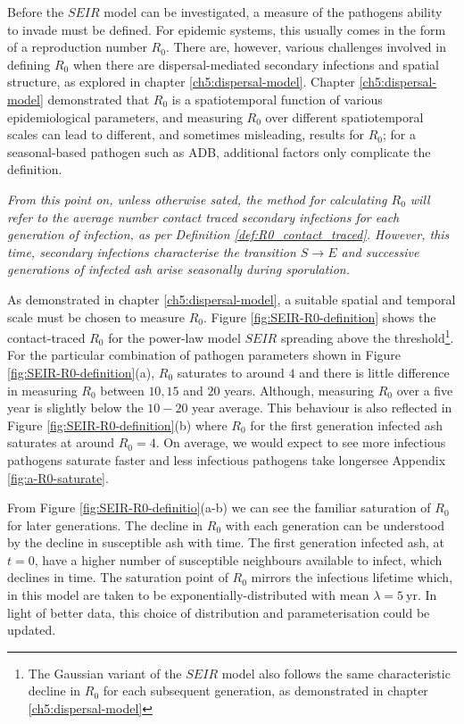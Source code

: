 Before the $SEIR$ model can be investigated, a measure of the pathogens ability to invade must be defined. For epidemic systems, this usually comes in the form of a reproduction number $R_0$. There are, however, various challenges involved in defining $R_0$ when there are dispersal-mediated secondary infections and spatial structure, as explored in chapter \ref{ch5:dispersal-model}. Chapter \ref{ch5:dispersal-model} demonstrated that $R_0$ is a spatiotemporal function of various epidemiological parameters, and measuring $R_0$ over different spatiotemporal scales can lead to different, and sometimes misleading, results for $R_0$; for a seasonal-based pathogen such as ADB, additional factors only complicate the definition. 

\textit{From this point on, unless otherwise sated, the method for calculating $R_0$ will refer to the average number contact traced secondary infections for each generation of infection, as per Definition \ref{def:R0_contact_traced}. However, this time, secondary infections characterise the transition $S\rightarrow E$ and successive generations of infected ash arise seasonally during sporulation.}

As demonstrated in chapter \ref{ch5:dispersal-model}, a suitable spatial and temporal scale must be chosen to measure $R_0$. Figure \ref{fig:SEIR-R0-definition} shows the contact-traced $R_0$ for the power-law model $SEIR$ spreading above the threshold\footnote{The Gaussian variant of the $SEIR$ model also follows the same characteristic decline in $R_0$ for each subsequent generation, as demonstrated in chapter \ref{ch5:dispersal-model}}. For the particular combination of pathogen parameters shown in Figure \ref{fig:SEIR-R0-definition}(a), $R_0$ saturates to around $4$ and there is little difference in measuring $R_0$ between $10, 15$ and $20$ years. Although, measuring $R_0$ over a five year is slightly below the $10-20$ year average. This behaviour is also reflected in Figure \ref{fig:SEIR-R0-definition}(b) where $R_0$ for the first generation infected ash saturates at around $R_0 = 4$. On average, we would expect to see more infectious pathogens saturate faster and less infectious pathogens take longer\textemdash see Appendix \ref{fig:a-R0-saturate}.

From Figure \ref{fig:SEIR-R0-definitio}(a-b) we can see the familiar saturation of $R_0$ for later generations. The decline in $R_0$ with each generation can be understood by the decline in susceptible ash with time. The first generation infected ash, at $t=0$, have a higher number of susceptible neighbours available to infect, which declines in time. The saturation point of $R_0$ mirrors the infectious lifetime which, in this model are taken to be exponentially-distributed with mean $\lambda=5\ \mathrm{yr}$. In light of better data, this choice of distribution and parameterisation could be updated. 

